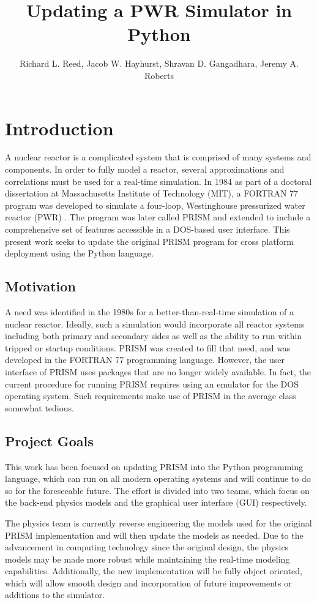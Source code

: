 \documentclass{anstrans}
\title{Updating a PWR Simulator in Python}
\author{Richard L. Reed, Jacob W. Hayhurst, Shravan D. Gangadhara, Jeremy A. Roberts}
\institute{
    Mechanical and Nuclear Engineering, Kansas State University, Manhattan, KS
}
\begin{document}
    
    \section{Introduction}
    
    A nuclear reactor is a complicated system that is comprised of many systems  
    and components.  In order to fully model a reactor, several 
    approximations and correlations must be used for a 
    real-time simulation.  In 1984 as part of a doctoral dissertation at 
    Massachusetts Institute of Technology (MIT), a 
    FORTRAN 77 program 
    was developed to simulate a four-loop, Westinghouse pressurized water reactor 
    (PWR) \cite{kao1984}.  The program was later called PRISM and extended to include
    a comprehensive set of features accessible in a DOS-based user interface.  
    This present work seeks to update the original PRISM program
    for cross platform deployment using the Python language.
    
    \subsection{Motivation}
    
    A need was identified in the 1980s for a better-than-real-time simulation of a nuclear 
    reactor.  Ideally, such a simulation would incorporate all 
    reactor systems including both primary and secondary sides as well as the 
    ability to run within tripped or startup conditions.  PRISM was created to fill that 
    need, and was developed in the FORTRAN 77 programming language.  However, the user
    interface of PRISM uses packages that are no longer widely available.
    In fact, the current procedure for running PRISM requires using an emulator for the DOS 
    operating system. Such requirements make use of PRISM in the average class somewhat
    tedious.
    
    \subsection{Project Goals}
    
    This work has been focused on updating PRISM into the Python programming 
    language, which can run on all modern operating systems and will continue to do 
    so for the foreseeable future.  The effort is divided into two teams, 
    which focus on the back-end physics models and the graphical user interface (GUI)
    respectively.  
    
    The physics team is currently reverse engineering the models used for the original 
    PRISM implementation and will then update the models as needed.  Due to the advancement
    in computing technology since the original design, the physics models may be made more
    robust while maintaining the real-time modeling capabilities.  Additionally,
    the new implementation will be fully object oriented, which will allow smooth
    design and incorporation of future improvements or additions to the simulator.
    
\end{document}

